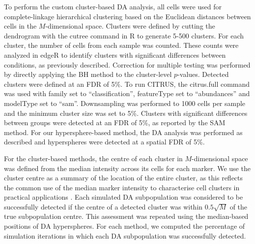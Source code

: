 \documentclass{article}
\begin{document}
To perform the custom cluster-based DA analysis, all cells were used for complete-linkage hierarchical clustering based on the Euclidean distances between cells in the $M$-dimensional space.
Clusters were defined by cutting the dendrogram with the cutree command in R to generate 5-500 clusters.
For each cluster, the number of cells from each sample was counted.
These counts were analyzed in edgeR to identify clusters with significant differences between conditions, as previously described.
Correction for multiple testing was performed by directly applying the BH method to the cluster-level $p$-values.
Detected clusters were defined at an FDR of 5\%.
To run CITRUS, the citrus.full command was used with family set to ``classification'', featureType set to ``abundances'' and modelType set to ``sam''.
Downsampling was performed to 1000 cells per sample and the minimum cluster size was set to 5\%.
Clusters with significant differences between groups were detected at an FDR of 5\%, as reported by the SAM method.
For our hypersphere-based method, the DA analysis was performed as described and hyperspheres were detected at a spatial FDR of 5\%.


For the cluster-based methods, the centre of each cluster in $M$-dimensional space was defined from the median intensity across its cells for each marker.
We use the cluster centre as a summary of the location of the entire cluster, as this reflects the common use of the median marker intensity to characterise cell clusters in practical applications \cite{qiu2011extracting,bruggner2014automated}.
Each simulated DA subpopulation was considered to be successfully detected if the centre of a detected cluster was within $0.5\sqrt{M}$ of the true subpopulation centre.
This assessment was repeated using the median-based positions of DA hyperspheres.
For each method, we computed the percentage of simulation iterations in which each DA subpopulation was successfully detected.
\end{document}
